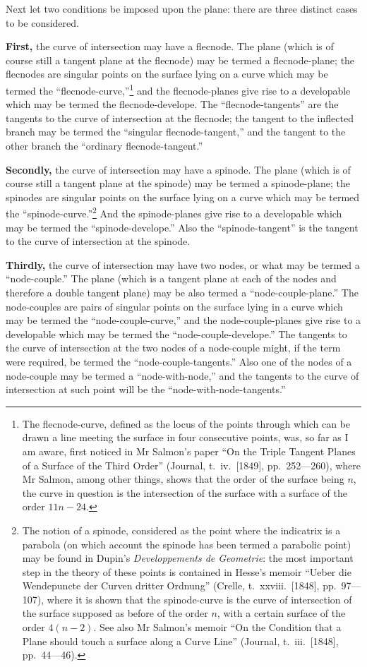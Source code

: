 \documentclass[11pt,a4paper]{article}
\theoremstyle{plain}
\begin{document}
Next let two conditions be imposed upon the plane: there are three distinct cases to be considered.

\textbf{First,} the curve of intersection may have a flecnode. The plane (which is of course still a tangent plane at the flecnode) may be termed a flecnode-plane; the flecnodes are singular points on the surface lying on a curve which may be termed the ``flecnode-curve,''\footnote{The flecnode-curve, defined as the locus of the points through which can be drawn a line meeting the surface in four consecutive points, was, so far as I am aware, first noticed in Mr Salmon's paper ``On the Triple Tangent Planes of a Surface of the Third Order'' (Journal, t.\ iv.\ [1849], pp.\ 252---260), where Mr Salmon, among other things, shows that the order of the surface being $n$, the curve in question is the intersection of the surface with a surface of the order $11n - 24$.} and the flecnode-planes give rise to a developable which may be termed the flecnode-develope. The ``flecnode-tangents'' are the tangents to the curve of intersection at the flecnode; the tangent to the inflected branch may be termed the ``singular flecnode-tangent,'' and the tangent to the other branch the ``ordinary flecnode-tangent.''

\textbf{Secondly,} the curve of intersection may have a spinode. The plane (which is of course still a tangent plane at the spinode) may be termed a spinode-plane; the spinodes are singular points on the surface lying on a curve which may be termed the ``spinode-curve.''\footnote{The notion of a spinode, considered as the point where the indicatrix is a parabola (on which account the spinode has been termed a parabolic point) may be found in Dupin's \textit{Developpements de Geometrie}: the most important step in the theory of these points is contained in Hesse's memoir ``Ueber die Wendepuncte der Curven dritter Ordnung'' (Crelle, t.\ xxviii.\ [1848], pp.\ 97---107), where it is shown that the spinode-curve is the curve of intersection of the surface supposed as before of the order $n$, with a certain surface of the order $4(n-2)$. See also Mr Salmon's memoir ``On the Condition that a Plane should touch a surface along a Curve Line'' (Journal, t.\ iii.\ [1848], pp.\ 44---46).} And the spinode-planes give rise to a developable which may be termed the ``spinode-develope.'' Also the ``spinode-tangent'' is the tangent to the curve of intersection at the spinode.

\textbf{Thirdly,} the curve of intersection may have two nodes, or what may be termed a ``node-couple.'' The plane (which is a tangent plane at each of the nodes and therefore a double tangent plane) may be also termed a ``node-couple-plane.'' The node-couples are pairs of singular points on the surface lying in a curve which may be termed the ``node-couple-curve,'' and the node-couple-planes give rise to a developable which may be termed the ``node-couple-develope.'' The tangents to the curve of intersection at the two nodes of a node-couple might, if the term were required, be termed the ``node-couple-tangents.'' Also one of the nodes of a node-couple may be termed a ``node-with-node,'' and the tangents to the curve of intersection at such point will be the ``node-with-node-tangents.''
\end{document}
